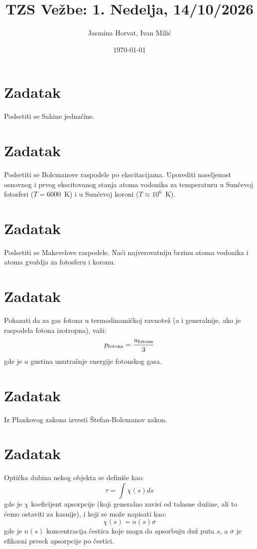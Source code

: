 \documentclass[12pt]{article}
\title{TZS Ve\v{z}be: 1. Nedelja, 14/10/2026}
\author{Jasmina Horvat, Ivan Mili\'{c}}
\date{\today}
\begin{document}
\maketitle

\section{Zadatak}
Podsetiti se Sahine jedna\v{c}ine. 

\section{Zadatak}
Podsetiti se Bolcmanove raspodele po ekscitacijama. Uporediti naseljenost osnovnog i prvog ekscitovanog stanja atoma vodonika za temperaturu 
u Sunčevoj fotosferi ($T=6000$~K) i u Sun\v{c}evoj koroni ($T \approx 10^6$~K).

\section{Zadatak}
Podsetiti se Maksvelove raspodele. Na\'{c}i najverovatniju brzinu atoma vodonika i atoma gvo\v{z}dja za fotosferu i koronu. 

\section{Zadatak}

Pokazati da za gas fotona u termodinami\v{c}koj ravnote\v{z} (a i generalnije, ako je raspodela fotona izotropna), va\v{z}i: 
\begin{equation}
    p_{\rm fotona} = \frac{u_{\rm fotona}}{3}
\end{equation}
gde je $u$ gustina unutra\v{s}nje energije fotonskog gasa.

\section{Zadatak}
Iz Plankovog zakona izvesti \v{S}tefan-Bolcmanov zakon. 

\section{Zadatak}
Opti\v{c}ka dubina nekog objekta se defini\v{s}e kao: 
\begin{equation}
\tau = \int \chi (s) ds
\end{equation}
gde je $\chi$ koeficijent apsorpcije (koji generalno zavisi od talasne du\v{z}ine, ali to \'{c}emo ostaviti za kasnije), i koji se mo\v{z}e napisati kao:
\begin{equation}
\chi (s) = n(s) \sigma
\end{equation}
gde je $n(s)$ koncentracija čestica koje mogu da apsorbuju duž puta $s$, a $\sigma$ je efikasni presek apsorpcije po čestici.
\end{document}
